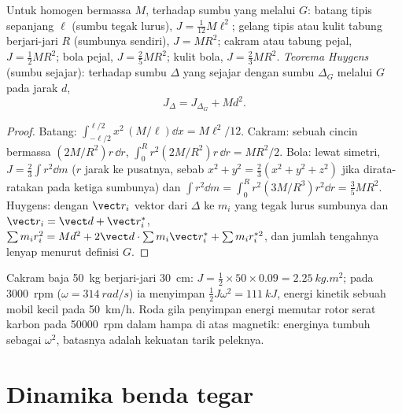 \begin{proposition}\label{prop:b2:rigid-body-mechanics:inertia}
Untuk  homogen bermassa $M$, terhadap sumbu yang melalui $G$:
batang tipis sepanjang $\ell$ (sumbu tegak lurus), $J = \tfrac1{12}M\ell^2$;
gelang tipis atau kulit tabung berjari-jari $R$ (sumbunya sendiri),
$J = MR^2$; cakram atau tabung pejal, $J = \tfrac12MR^2$; bola pejal,
$J = \tfrac25MR^2$; kulit bola, $J = \tfrac23MR^2$. \emph{Teorema
Huygens} (sumbu sejajar): terhadap sumbu $\Delta$ yang sejajar dengan
sumbu $\Delta_G$ melalui $G$ pada jarak $d$,
\[
J_\Delta = J_{\Delta_G} + Md^2 .
\]
\end{proposition}

\begin{proof}
Batang: $\int_{-\ell/2}^{\ell/2}x^2\,(M/\ell)\dd x = M\ell^2/12$. Cakram:
sebuah cincin bermassa $(2M/R^2)r\,\dd r$, $\int_0^R r^2(2M/R^2)r\,\dd r = MR^2/2$.
Bola: lewat simetri, $J = \tfrac23\int r^2\dd m$ ($r$ jarak ke pusatnya,
sebab $x^2 + y^2 = \tfrac23(x^2 + y^2 + z^2)$ jika dirata-ratakan pada
ketiga sumbunya) dan $\int r^2\dd m = \int_0^R r^2(3M/R^3)r^2\dd r = \tfrac35MR^2$.
Huygens: dengan $\vect r_i$ vektor dari $\Delta$ ke $m_i$ yang tegak lurus
sumbunya dan $\vect r_i = \vect d + \vect r_i^*$, $\sum m_ir_i^2 = Md^2
+ 2\vect d\cdot\sum m_i\vect r_i^* + \sum m_ir_i^{*2}$, dan jumlah
tengahnya lenyap menurut definisi $G$.
\end{proof}

\begin{example}\label{ex:b2:rigid-body-mechanics:flywheel}
Cakram baja \qty{50}{kg} berjari-jari \qty{30}{cm}: $J = \tfrac12 \times
50 \times 0.09 = \qty{2.25}{kg.m^2}$; pada \qty{3000}{rpm} ($\omega =
\qty{314}{rad/s}$) ia menyimpan $\tfrac12J\omega^2 = \qty{111}{kJ}$,
energi kinetik sebuah mobil kecil pada \qty{50}{km/h}. Roda gila
penyimpan energi memutar rotor serat karbon pada \qty{50000}{rpm} dalam
hampa di atas  magnetik: energinya tumbuh sebagai $\omega^2$,
batasnya adalah kekuatan tarik peleknya.
\end{example}

\section{Dinamika benda tegar}

